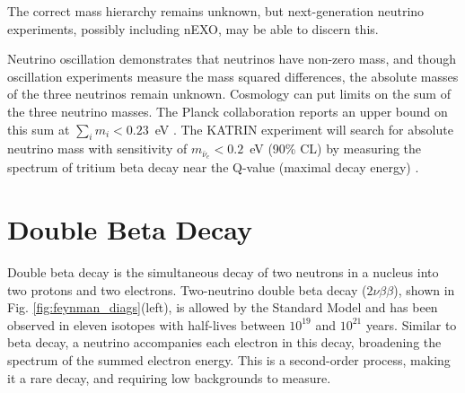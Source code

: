\noindent
The correct mass hierarchy remains unknown, but next-generation neutrino experiments, possibly including nEXO, may be able to discern this.

Neutrino oscillation demonstrates that neutrinos have non-zero mass, and though oscillation experiments measure the mass squared differences, the absolute masses of the three neutrinos remain unknown.  Cosmology can put limits on the sum of the three neutrino masses.  The Planck collaboration reports an upper bound on this sum at $\sum\limits_{i} m_{i} < 0.23$~eV \cite{Planck}.  The KATRIN experiment will search for absolute neutrino mass with sensitivity of $m_{\bar{\nu}_{e}} < 0.2$~eV (90\% CL) by measuring the spectrum of tritium beta decay near the Q-value (maximal decay energy) \cite{KATRIN}.

\section{Double Beta Decay}

Double beta decay is the simultaneous decay of two neutrons in a nucleus into two protons and two electrons.  Two-neutrino double beta decay ($2\nu\beta\beta$), shown in Fig. \ref{fig:feynman_diags}(left), is allowed by the Standard Model and has been observed in eleven isotopes with half-lives between $10^{19}$ and $10^{21}$ years.  Similar to beta decay, a neutrino accompanies each electron in this decay, broadening the spectrum of the summed electron energy. This is a second-order process, making it a rare decay, and requiring low backgrounds to measure.

